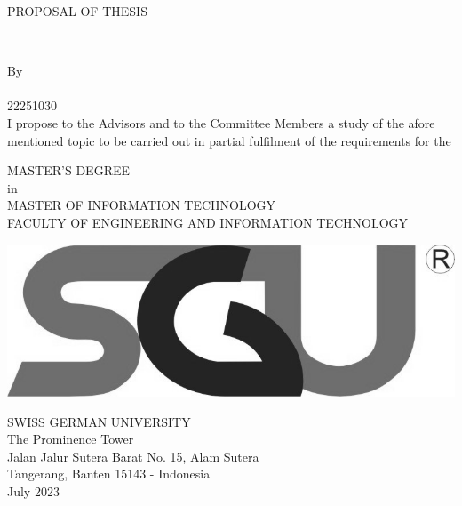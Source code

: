 
\begin{titlepage}
\begin{center}

PROPOSAL OF THESIS
\begin{spacing}{2}
	\textbf{ \TITLE} \\[0.7in]
\end{spacing}

\begin{spacing}{1.5}
	By \\ \AUTHOR \\ 22251030 \\[0.5in]
	
	I propose to the Advisors and to the Committee Members a study of the afore mentioned topic to be carried out in partial fulfilment of the requirements for the

    MASTER'S DEGREE \\ in \\ MASTER OF INFORMATION TECHNOLOGY \\ FACULTY OF ENGINEERING AND INFORMATION TECHNOLOGY \\[0.7in]
\end{spacing}
	  
\vfill
\centering \includegraphics{images/sgu}  \\%
\vfill



\hfil
\begin{spacing}{1}
	SWISS GERMAN UNIVERSITY \\
    The Prominence Tower \\
    Jalan Jalur Sutera Barat No. 15, Alam Sutera \\
    Tangerang, Banten 15143 - Indonesia \\[0.5in]
    
    July 2023
\end{spacing}

\end{center}
\end{titlepage}

